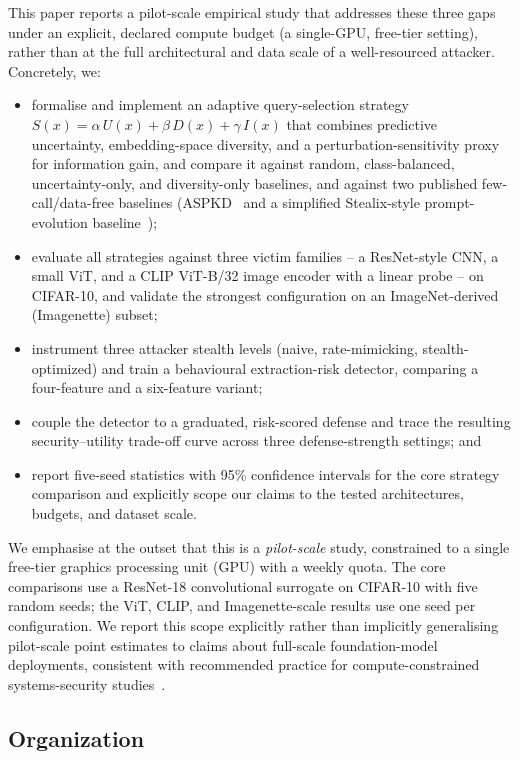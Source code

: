 \documentclass[journal,10pt]{IEEEtran}
\begin{document}
This paper reports a pilot-scale empirical study that addresses these three gaps under an explicit,
declared compute budget (a single-GPU, free-tier setting), rather than at the full architectural
and data scale of a well-resourced attacker. Concretely, we:

\begin{itemize}
\item formalise and implement an adaptive query-selection strategy
$S(x)=\alpha\,U(x)+\beta\,D(x)+\gamma\,I(x)$ that combines predictive uncertainty, embedding-space
diversity, and a perturbation-sensitivity proxy for information gain, and compare it against
random, class-balanced, uncertainty-only, and diversity-only baselines, and against two published
few-call/data-free baselines (ASPKD~\cite{hondru2025aspkd} and a simplified Stealix-style
prompt-evolution baseline~\cite{zhuang2025stealix});
\item evaluate all strategies against three victim families -- a ResNet-style CNN, a small ViT, and
a CLIP ViT-B/32 image encoder with a linear probe -- on CIFAR-10, and validate the strongest
configuration on an ImageNet-derived (Imagenette) subset;
\item instrument three attacker stealth levels (naive, rate-mimicking, stealth-optimized) and train
a behavioural extraction-risk detector, comparing a four-feature and a six-feature variant;
\item couple the detector to a graduated, risk-scored defense and trace the resulting
security--utility trade-off curve across three defense-strength settings; and
\item report five-seed statistics with 95\% confidence intervals for the core strategy comparison
and explicitly scope our claims to the tested architectures, budgets, and dataset scale.
\end{itemize}

We emphasise at the outset that this is a \emph{pilot-scale} study, constrained to a single
free-tier graphics processing unit (GPU) with a weekly quota. The core comparisons use a
ResNet-18 convolutional surrogate on CIFAR-10 with five random seeds; the ViT, CLIP, and
Imagenette-scale results use one seed per configuration. We report this scope explicitly rather
than implicitly generalising pilot-scale point estimates to claims about full-scale foundation-model
deployments, consistent with recommended practice for compute-constrained systems-security
studies~\cite{oliynyk2023survey,zhao2025systematic}.

\subsection{Organization}
\end{document}
